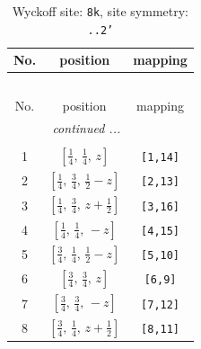 \documentclass[fleqn,8pt]{jsarticle}
\begin{document}
\begin{longtable}{ccc}
\caption{Wyckoff site: {\tt 8k}, site symmetry: {\tt ..2'}}
 \\
 \hline \hline
No. & position & mapping \\ \hline \endfirsthead

\multicolumn{2}{l}{\tablename\ \thetable{}} \\
 \hline \hline
No. & position & mapping \\ \hline \endhead

 \hline \hline
\multicolumn{2}{r}{\footnotesize\it continued ...} \\ \endfoot

 \hline \hline
\multicolumn{2}{r}{} \\ \endlastfoot

1 & $\left[ \frac{1}{4},\, \frac{1}{4},\, z \right]$ & {\tt [1,14]} \\ \hline
2 & $\left[ \frac{1}{4},\, \frac{3}{4},\, \frac{1}{2} - z \right]$ & {\tt [2,13]} \\ \hline
3 & $\left[ \frac{1}{4},\, \frac{3}{4},\, z + \frac{1}{2} \right]$ & {\tt [3,16]} \\ \hline
4 & $\left[ \frac{1}{4},\, \frac{1}{4},\, - z \right]$ & {\tt [4,15]} \\ \hline
5 & $\left[ \frac{3}{4},\, \frac{1}{4},\, \frac{1}{2} - z \right]$ & {\tt [5,10]} \\ \hline
6 & $\left[ \frac{3}{4},\, \frac{3}{4},\, z \right]$ & {\tt [6,9]} \\ \hline
7 & $\left[ \frac{3}{4},\, \frac{3}{4},\, - z \right]$ & {\tt [7,12]} \\ \hline
8 & $\left[ \frac{3}{4},\, \frac{1}{4},\, z + \frac{1}{2} \right]$ & {\tt [8,11]} \\
\end{longtable}
\renewcommand{\arraystretch}{1.2}
\end{document}
